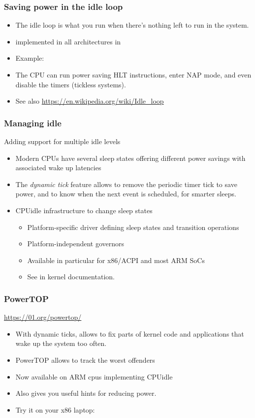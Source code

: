 \begin{frame}
  \frametitle{Saving power in the idle loop}
  \begin{itemize}
  \item The idle loop is what you run when there's nothing left to run
    in the system.
  \item {} implemented in all architectures in
  \item Example: 
  \item The CPU can run power saving HLT instructions, enter NAP mode,
    and even disable the timers (tickless systems).
  \item See also \url{https://en.wikipedia.org/wiki/Idle_loop}
  \end{itemize}
\end{frame}

\begin{frame}
  \frametitle{Managing idle}
  Adding support for multiple idle levels
  \begin{itemize}
  \item Modern CPUs have several sleep states offering different
    power savings with associated wake up latencies
  \item The {\em dynamic tick} feature allows to remove the
    periodic timer tick to save power, and to know when the next event is
    scheduled, for smarter sleeps.
  \item CPUidle infrastructure to change sleep states
    \begin{itemize}
    \item Platform-specific driver defining sleep states and
      transition operations
    \item Platform-independent governors
    \item Available in particular for x86/ACPI and most ARM SoCs
    \item See  in kernel documentation.
    \end{itemize}
  \end{itemize}
\end{frame}

\begin{frame}
  \frametitle{PowerTOP}
  \url{https://01.org/powertop/}
  \begin{itemize}
  \item With dynamic ticks, allows to fix parts of kernel code and
    applications that wake up the system too often.
  \item PowerTOP allows to track the worst offenders
  \item Now available on ARM cpus implementing CPUidle
  \item Also gives you useful hints for reducing power.
  \item Try it on your x86 laptop:\\
  \end{itemize}
\end{frame}

